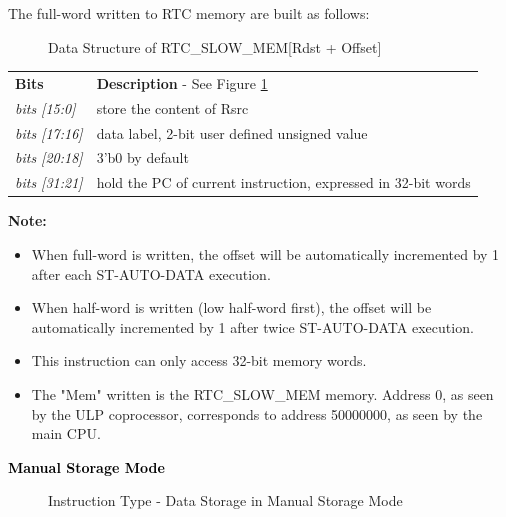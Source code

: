 \documentclass[main\_\_EN.tex]{subfiles}
\begin{document}
The full-word written to RTC memory are built as follows:

%
%
%
%
\begin{figure}[!ht ]
    \centering
    \caption{Data Structure of RTC\_SLOW\_MEM[Rdst + Offset]}
    \label{figure:RTCMEM}
\end{figure}

\begin{tabular}{ l l }
\textbf{Bits} & \textbf{Description} - See Figure \ref{figure:RTCMEM} \\
\textit{bits [15:0] } & store the content of Rsrc\\
\textit{bits [17:16] } & data label, 2-bit user defined unsigned value\\
\textit{bits [20:18]} & 3'b0 by default \\
\textit{bits [31:21]} & hold the PC of current instruction, expressed in 32-bit words\\

\end{tabular}

\textbf{Note:}
\begin{itemize}
    \item When full-word is written, the offset will be automatically incremented by 1 after each ST-AUTO-DATA execution.
    \item When half-word is written (low half-word first), the offset will be automatically incremented by 1 after twice ST-AUTO-DATA execution.
    \item This instruction can only access 32-bit memory words.
    \item The "Mem" written is the RTC\_SLOW\_MEM memory. Address 0, as seen by the ULP coprocessor, corresponds to address \hexprefix{}50000000, as seen by the main CPU.
\end{itemize}


\textcolor{black}{\bfseries Manual Storage Mode}


%
%
%
%
%
%
%
%
%
%
\begin{figure}[!ht ]
    \centering
    \caption{Instruction Type - Data Storage in Manual Storage Mode}
    \label{figure:STM}
\end{figure}
\end{document}
